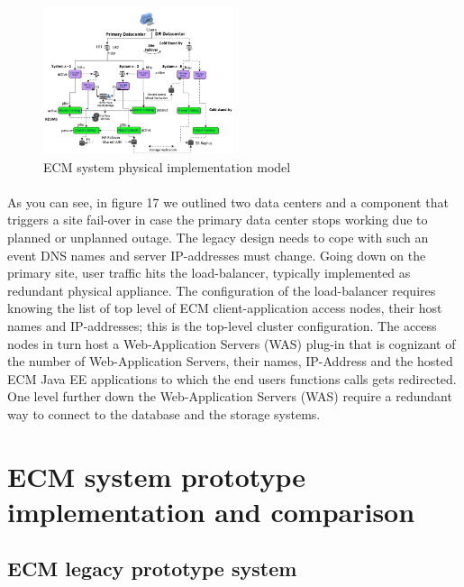\documentclass[EPiC]{easychair} %
\begin{document}
\begin{figure}[hbt!]
	\begin{centering}
	\includegraphics[width=0.5\textwidth]{pics/ECMpic17}
	\caption{ECM system physical implementation model}
	\label{fig:ecm-model-implementaion}
	\end{centering}
\end{figure}

    \paragraph{} As you can see, in figure 17 we outlined two data centers and a component that triggers a site fail-over in case the primary data center stops working due to planned or unplanned outage. The legacy design needs to cope with such an event DNS names and server IP-addresses must change. Going down on the primary site, user traffic hits the load-balancer, typically implemented as redundant physical appliance. The configuration of the load-balancer requires knowing the list of top level of ECM client-application access nodes, their host names and IP-addresses; this is the top-level cluster configuration. The access nodes in turn host a Web-Application Servers (WAS) plug-in that is cognizant of the number of Web-Application Servers, their names, IP-Address and the hosted ECM Java EE applications to which the end users functions calls gets redirected. One level further down the Web-Application Servers (WAS) require a redundant way to connect to the database and the storage systems. 

\section{ECM system prototype implementation and comparison}
\label{sec:prototype}
\subsection{ ECM legacy prototype system}
\end{document}
